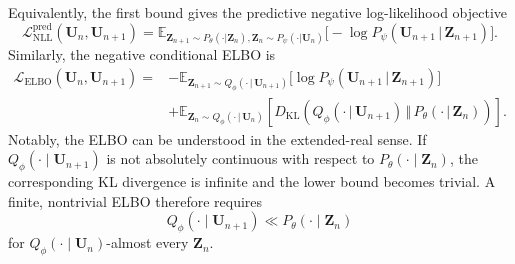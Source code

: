 \documentclass[11pt]{article}
\newcommand{\bbE}{\mathbb{E}}
\begin{document}
\begin{remark}
Equivalently, the first bound gives the predictive negative log-likelihood objective
\begin{equation}
    \mathcal L_{\mathrm{NLL}}^{\mathrm{pred}}(\mathbf U_n,\mathbf U_{n+1})=\bbE_{\mathbf{Z}_{n+1}\sim P_\theta(\cdot|\mathbf{Z}_n),\mathbf{Z}_n\sim P_\psi(\cdot|\mathbf{U}_n)}\bigl[-\log P_\psi(\mathbf{U}_{n+1}\,|\,\mathbf{Z}_{n+1})\bigr].\label{eq:pred_nll}
\end{equation}
Similarly, the negative conditional ELBO is
\begin{equation}
\begin{aligned}
    \mathcal L_{\mathrm{ELBO}}(\mathbf U_n,\mathbf U_{n+1})
    =
    &
    -
    \mathbb E_{\mathbf Z_{n+1}\sim Q_\phi(\cdot\,|\, \mathbf U_{n+1})}
    \big[
        \log P_\psi(\mathbf U_{n+1}\,|\, \mathbf Z_{n+1})
    \big]
    \\
    &+
    \mathbb E_{\mathbf Z_n\sim Q_\phi(\cdot\,|\, \mathbf U_n)}
    \left[
    D_{\mathrm{KL}}
    \left(
        Q_\phi(\cdot\,|\, \mathbf U_{n+1})
        \,\Vert\,
        P_\theta(\cdot\,|\, \mathbf Z_n)
    \right)
    \right].
\end{aligned}\label{eq:condnegelbo}
\end{equation}
Notably, the ELBO can be understood in the extended-real sense. If $Q_\phi(\cdot\mid \mathbf U_{n+1})$ is not absolutely continuous with respect to $P_\theta(\cdot\mid\mathbf Z_n)$, the corresponding KL divergence is infinite and the lower bound becomes trivial. A finite, nontrivial ELBO therefore requires
\[
    Q_\phi(\cdot\mid \mathbf U_{n+1})
    \ll
    P_\theta(\cdot\mid \mathbf Z_n)
\]
for $Q_\phi(\cdot\mid \mathbf U_n)$-almost every $\mathbf Z_n$.
\end{remark}
\end{document}
